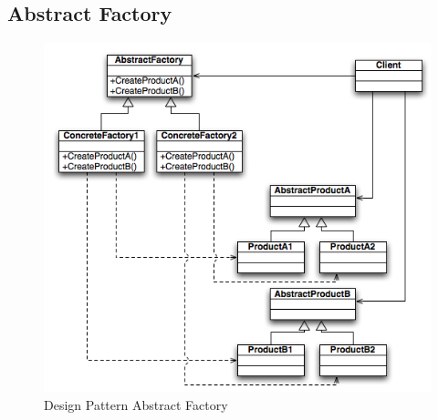 \subsection{Abstract Factory}
	\begin{figure}[h!]
	\begin{center}
		\includegraphics[scale=1]{../images/AbsFactory.png}
		\caption{Design Pattern Abstract Factory}
	\end{center}
	\end{figure}
